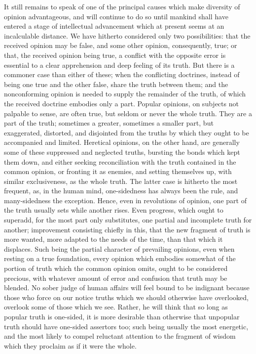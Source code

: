 \documentclass[11pt,openany]{book}
\begin{document}
It still remains to speak of one of the principal causes which make diversity of opinion advantageous, and will continue to do so until mankind shall have entered a stage of intellectual advancement which at present seems at an incalculable distance. We have hitherto considered only two possibilities: that the received opinion may be false, and some other opinion, consequently, true; or that, the received opinion being true, a conflict with the opposite error is essential to a clear apprehension and deep feeling of its truth. But there is a commoner case than either of these; when the conflicting doctrines, instead of being one true and the other false, share the truth between them; and the nonconforming opinion is needed to supply the remainder of the truth, of which the received doctrine embodies only a part. Popular opinions, on subjects not palpable to sense, are often true, but seldom or never the whole truth. They are a part of the truth; sometimes a greater, sometimes a smaller part, but exaggerated, distorted, and disjointed from the truths by which they ought to be accompanied and limited. Heretical opinions, on the other hand, are generally some of these suppressed and neglected truths, bursting the bonds which kept them down, and either seeking reconciliation with the truth contained in the common opinion, or fronting it as enemies, and setting themselves up, with similar exclusiveness, as the whole truth. The latter case is hitherto the most frequent, as, in the human mind, one-sidedness has always been the rule, and many-sidedness the exception. Hence, even in revolutions of opinion, one part of the truth usually sets while another rises. Even progress, which ought to superadd, for the most part only substitutes, one partial and incomplete truth for another; improvement consisting chiefly in this, that the new fragment of truth is more wanted, more adapted to the needs of the time, than that which it displaces. Such being the partial character of prevailing opinions, even when resting on a true foundation, every opinion which embodies somewhat of the portion of truth which the common opinion omits, ought to be considered precious, with whatever amount of error and confusion that truth may be blended. No sober judge of human affairs will feel bound to be indignant because those who force on our notice truths which we should otherwise have overlooked, overlook some of those which we see. Rather, he will think that so long as popular truth is one-sided, it is more desirable than otherwise that unpopular truth should have one-sided assertors too; such being usually the most energetic, and the most likely to compel reluctant attention to the fragment of wisdom which they proclaim as if it were the whole.
\end{document}
